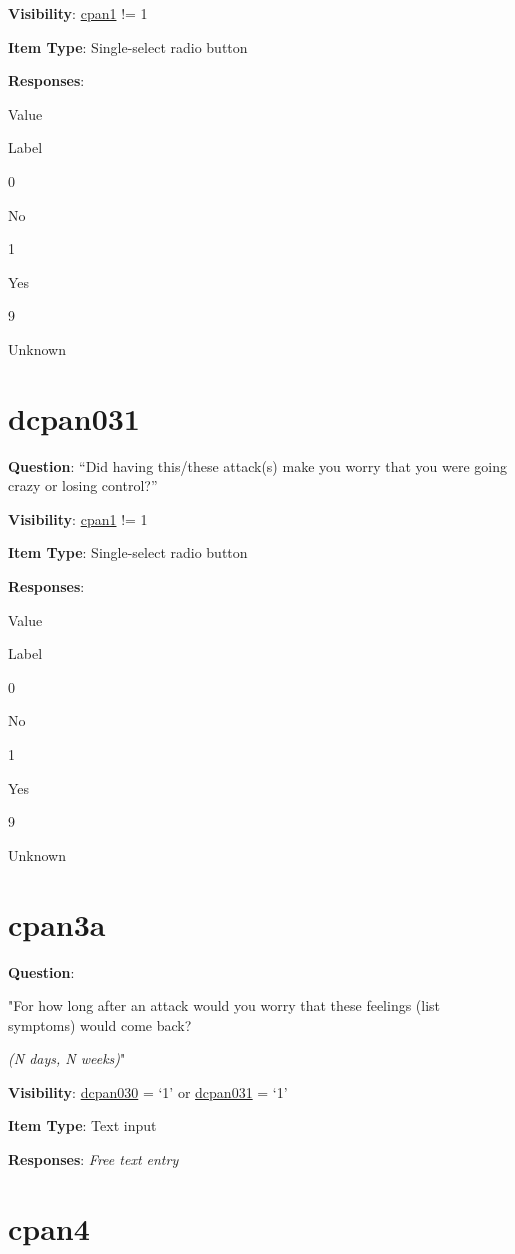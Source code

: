 \documentclass[]{book}
\begin{document}
\textbf{Visibility}: \protect\hyperlink{cpan1}{cpan1} != 1

\textbf{Item Type}: Single-select radio button

\textbf{Responses}:

Value

Label

0

No

1

Yes

9

Unknown

\hypertarget{dcpan031}{%
\section{dcpan031}\label{dcpan031}}

\textbf{Question}: ``Did having this/these attack(s) make you worry that you were going crazy or losing control?''

\textbf{Visibility}: \protect\hyperlink{cpan1}{cpan1} != 1

\textbf{Item Type}: Single-select radio button

\textbf{Responses}:

Value

Label

0

No

1

Yes

9

Unknown

\hypertarget{cpan3a}{%
\section{cpan3a}\label{cpan3a}}

\textbf{Question}:

"For how long after an attack would you worry that these feelings (list symptoms) would come back?

\emph{(N days, N weeks)}"

\textbf{Visibility}: \protect\hyperlink{dcpan030}{dcpan030} = `1' or \protect\hyperlink{dcpan031}{dcpan031} = `1'

\textbf{Item Type}: Text input

\textbf{Responses}: \emph{Free text entry}

\hypertarget{cpan4}{%
\section{cpan4}\label{cpan4}}
\end{document}
